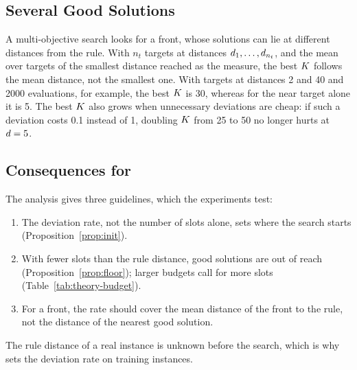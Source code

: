 \subsection{Several Good Solutions}
\label{sec:theory:multi}

A multi-objective search looks for a front, whose solutions can lie at different distances from the rule.
With $n_t$ targets at distances $d_1, \dots, d_{n_t}$, and the mean over targets of the smallest distance reached as the measure,
the best $K$ follows the mean distance, not the smallest one.
With targets at distances 2 and 40 and 2000 evaluations, for example, the best $K$ is 30, whereas for the near target alone it is 5.
The best $K$ also grows when unnecessary deviations are cheap: if such a deviation costs 0.1 instead of 1, doubling $K$ from 25 to 50 no longer hurts at $d = 5$.

\subsection{Consequences for \RDD}
\label{sec:theory:consequences}

The analysis gives three guidelines, which the experiments test:
\begin{enumerate}
  \item The deviation rate, not the number of slots alone, sets where the search starts (Proposition~\ref{prop:init}).
  \item With fewer slots than the rule distance, good solutions are out of reach (Proposition~\ref{prop:floor}); larger budgets call for more slots (Table~\ref{tab:theory-budget}).
  \item For a front, the rate should cover the mean distance of the front to the rule, not the distance of the nearest good solution.
\end{enumerate}
The rule distance of a real instance is unknown before the search, which is why \RDD sets the deviation rate on training instances.
